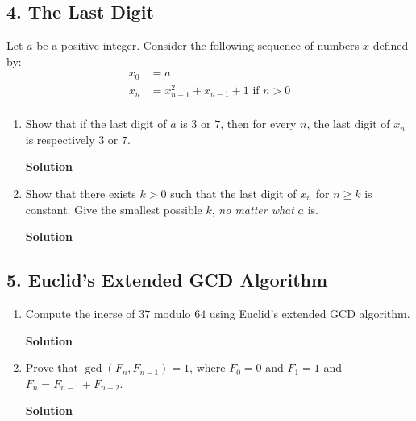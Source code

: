 \documentclass{article}\usepackage{amsmath,amssymb,amsthm,tikz,tkz-graph,color,chngpage,soul,hyperref,csquotes,graphicx,floatrow}\newcommand*{\QEDB}{\hfill\ensuremath{\square}}\newtheorem*{prop}{Proposition}\renewcommand{\theenumi}{\alph{enumi}}\usepackage[shortlabels]{enumitem}\usepackage[nobreak=true]{mdframed}\usetikzlibrary{matrix,calc}\MakeOuterQuote{"}\usepackage[margin=0.75in]{geometry}
\begin{document}
\subsection*{4. The Last Digit}
Let $a$ be a positive integer. Consider the following sequence of numbers $x$ defined by:
\begin{align*}
x_0 &= a \\
x_n &= x_{n-1}^2+x_{n-1}+1\text{  if  }n>0 \\
\end{align*}
\begin{enumerate}
\item Show that if the last digit of $a$ is $3$ or $7$, then for every $n$, the last digit of $x_n$ is respectively $3$ or $7$.
\begin{mdframed}
\textbf{Solution}

\end{mdframed}
\item Show that there exists $k>0$ such that the last digit of $x_n$ for $n\geqslant k$ is constant. Give the smallest possible $k$, \textit{no matter what} $a$ is.
\begin{mdframed}
\textbf{Solution}

\end{mdframed}
\end{enumerate}
\clearpage


\subsection*{5. Euclid's Extended GCD Algorithm}
\begin{enumerate}
\item Compute the inerse of $37$ modulo $64$ using Euclid's extended GCD algorithm.
\begin{mdframed}
\textbf{Solution}

\end{mdframed}
\item Prove that $\gcd\left(F_n,F_{n-1}\right)=1$, where $F_0=0$ and $F_1=1$ and $F_n=F_{n-1}+F_{n-2}$.
\begin{mdframed}
\textbf{Solution}

\end{mdframed}
\end{enumerate}
\clearpage

\end{document}

